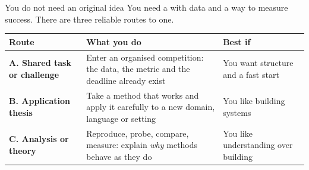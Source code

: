 \documentclass[aspectratio=169,11pt]{beamer}
\begin{document}
\begin{frame}{You do not need an original idea}
You need a  with data and a way to measure success.
There are three reliable routes to one.

\vspace{4mm}
\footnotesize
\begin{tabularx}{\textwidth}{>{\raggedright\arraybackslash}p{3.2cm} X >{\raggedright\arraybackslash}p{3.4cm}}
\toprule
\textbf{\color{brand}Route} & \textbf{\color{brand}What you do} & \textbf{\color{brand}Best if} \\
\midrule
\rowcolor{rowtint}
\textbf{A. Shared task or challenge} & Enter an organised competition: the
data, the metric and the deadline already exist & You want structure and a fast
start \\
\textbf{B. Application thesis} & Take a method that works and apply it
carefully to a new domain, language or setting & You like building systems \\
\rowcolor{rowtint}
\textbf{C. Analysis or theory} & Reproduce, probe, compare, measure: explain
\emph{why} methods behave as they do & You like understanding over building \\
\bottomrule
\end{tabularx}
\end{frame}
\end{document}
